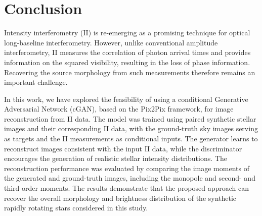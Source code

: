 \section{Conclusion}\label{sec:conclusion}
Intensity interferometry (II) is re-emerging as a promising technique for optical long-baseline interferometry. However, unlike conventional amplitude interferometry, II measures the correlation of photon arrival times and provides information on the squared visibility, resulting in the loss of phase information. Recovering the source morphology from such measurements therefore remains an important challenge.

In this work, we have explored the feasibility of using a conditional Generative Adversarial Network (cGAN), based on the Pix2Pix framework, for image reconstruction from II data. The model was trained using paired synthetic stellar images and their corresponding II data, with the ground-truth sky images serving as targets and the II measurements as conditional inputs. The generator learns to reconstruct images consistent with the input II data, while the discriminator encourages the generation of realistic stellar intensity distributions. The reconstruction performance was evaluated by comparing the image moments of the generated and ground-truth images, including the monopole and second- and third-order moments. The results demonstrate that the proposed approach can recover the overall morphology and brightness distribution of the synthetic rapidly rotating stars considered in this study.

